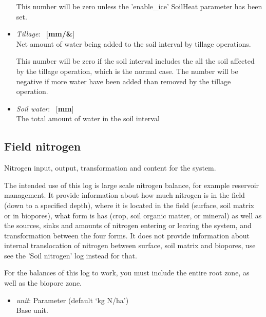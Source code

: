 \documentclass[a4paper]{article}
\begin{document}
\begin{itemize}
This number will be zero unless the 'enable\_ice' SoilHeat parameter
has been set.
\item \textit{Tillage}: ~$[$\textbf{mm/\&}$]$\\
Net amount of water being added to the soil interval by tillage operations.

This number will be zero if the soil interval includes the all the
soil affected by the tillage operation, which is the normal case.  The
number will be negative if more water have been added than removed by
the tillage operation.
\item \textit{Soil water}: ~$[$\textbf{mm}$]$\\
The total amount of water in the soil interval
\end{itemize}

\subsection{Field nitrogen}
\label{model:log-Field nitrogen}

Nitrogen input, output, transformation and content for the system.

The intended use of this log is large scale nitrogen balance, for
example reservoir management. It provide information about how
much nitrogen is in the field (down to a specified depth), where
it is located in the field (surface, soil matrix or in biopores),
what form is has (crop, soil organic matter, or mineral) as well
as the sources, sinks and amounts of nitrogen entering or leaving
the system, and transformation between the four forms.  It does
not provide information about internal translocation of nitrogen
between surface, soil matrix and biopores, use see the 'Soil
nitrogen' log instead for that.

For the balances of this log to work, you must include the entire
root zone, as well as the biopore zone.
\begin{itemize}
\item \textit{unit}: Parameter (default `kg N/ha')\\
Base unit.
\end{itemize}
\end{document}
